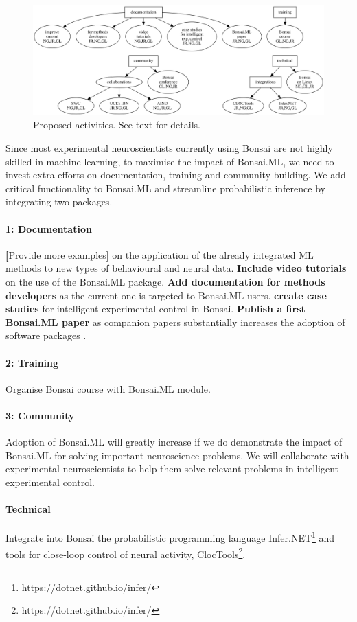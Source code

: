 
\begin{figure}
    \centering
    \includegraphics[width=6in]{activitiesGraphs/activities_larger.png}
    \caption{Proposed activities. See text for details.}
\end{figure}

Since most experimental neuroscientists currently using Bonsai are not highly
skilled in machine learning, to maximise the impact of Bonsai.ML, we need to
invest extra efforts on documentation, training and community building.
%
We add critical functionality to Bonsai.ML and streamline probabilistic
inference by integrating two packages.

\paragraph{1: Documentation} \textbf[Provide more examples] on the application
of the already integrated ML methods to new types of behavioural and neural
data. \textbf{Include video tutorials} on the use of the Bonsai.ML package.
\textbf{Add documentation for methods developers} as the current one is
targeted to Bonsai.ML users. \textbf{create case studies} for intelligent
experimental control in Bonsai. \textbf{Publish a first Bonsai.ML paper} as
companion papers substantially increases the adoption of software packages
\citep{lopesEtAl15,guilbeaultEtAl21}.

\paragraph{2: Training} Organise Bonsai course with Bonsai.ML module.

\paragraph{3: Community} Adoption of Bonsai.ML will greatly increase if we do
demonstrate the impact of Bonsai.ML for solving important neuroscience
problems.
%
We will collaborate with experimental neuroscientists to help them solve
relevant problems in intelligent experimental control.

\paragraph{Technical} Integrate into Bonsai the probabilistic programming
language Infer.NET\footnote[6]{https://dotnet.github.io/infer/} and tools for
close-loop control of neural activity,
ClocTools\footnote[7]{https://dotnet.github.io/infer/}.
